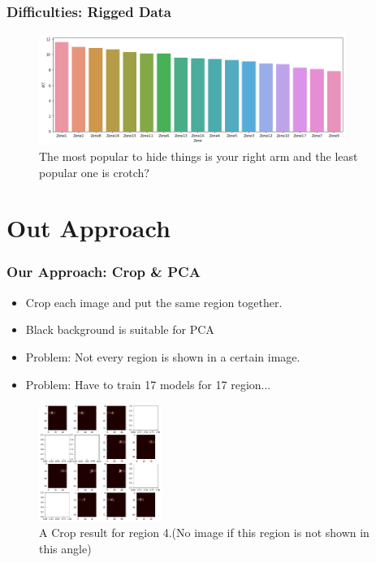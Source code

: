 \documentclass{beamer}
\begin{document}
\begin{frame}
\frametitle{Difficulties: Rigged Data}
	\begin{figure}
		\centering
		\includegraphics[width=10cm]{../Pic/bars.png}
		\caption{The most popular to hide things is your right arm and the least popular one is crotch?}
	\end{figure}	
\end{frame}


\section{Out Approach} %

\begin{frame}
\frametitle{Our Approach: Crop \& PCA}
	\begin{itemize}
		\item Crop each image and put the same region together.
		\item Black background is suitable for PCA
		\item Problem: Not every region is shown in a certain image.
		\item Problem: Have to train 17 models for 17 region...
	\end{itemize}
	\begin{figure}
		\centering
		\includegraphics[width=4cm]{../Pic/cropped.png}
		\caption{A Crop result for region 4.(No image if this region is not shown in this angle)}
	\end{figure}
\end{frame}
\end{document}
